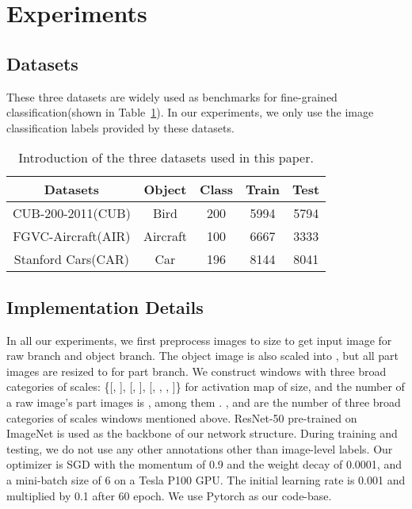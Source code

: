 \documentclass[runningheads]{llncs}
\begin{document}
\section{Experiments}
\subsection{Datasets}
These three datasets are widely used as benchmarks for fine-grained classification(shown in Table~\ref {tb1}). In our experiments, we only use the image classification labels provided by these datasets. 
\begin{table}
\centering
\caption{Introduction of the three datasets used in this paper.}\label{tb1}
\begin{tabular}{|c|c|c|c|c|}
\hline
Datasets & Object & Class & Train & Test\\
\hline
CUB-200-2011(CUB) \cite{WahCUB_200_2011} & Bird & 200 & 5994 &  5794\\
FGVC-Aircraft(AIR) \cite{maji2013fine} & Aircraft & 100  & 6667 &  3333\\
Stanford Cars(CAR) \cite{KrauseStarkDengFei-Fei_3DRR2013} & Car &  196  & 8144 &  8041\\
\hline
\end{tabular}
\end{table}
\subsection{Implementation Details}
In all our experiments, we first preprocess images to size  to get input image for raw branch and object branch. The object image is also scaled into  , but all part images are resized to  for part branch. We construct windows with three broad categories of scales: \{[, ], [, ], [, , , ]\} for activation map of  size, and the number of a raw image's part images is  , among them . ,  and  are the number of three broad categories of scales windows mentioned above. ResNet-50 \cite{he2016deep} pre-trained on ImageNet is used as the backbone of our network structure. During training and testing, we do not use any other annotations other than image-level labels. Our optimizer is SGD with the momentum of 0.9 and the weight decay of 0.0001, and a mini-batch size of 6 on a Tesla P100 GPU. The initial learning rate is 0.001 and multiplied by 0.1 after 60 epoch. We use Pytorch as our code-base.
\end{document}
